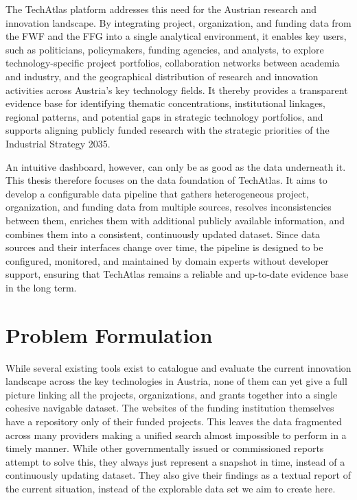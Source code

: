 The TechAtlas platform addresses this need for the Austrian research and innovation landscape.
By integrating project, organization, and funding data from the FWF and the FFG into a single analytical environment,
it enables key users, such as politicians, policymakers, funding agencies, and analysts, to explore technology-specific
project portfolios, collaboration networks between academia and industry, and the geographical distribution of research
and innovation activities across Austria's key technology fields.
It thereby provides a transparent evidence base for identifying thematic concentrations, institutional linkages,
regional patterns, and potential gaps in strategic technology portfolios, and supports aligning publicly funded research
with the strategic priorities of the Industrial Strategy 2035.

An intuitive dashboard, however, can only be as good as the data underneath it.
This thesis therefore focuses on the data foundation of TechAtlas.
It aims to develop a configurable data pipeline that gathers heterogeneous project, organization, and funding data from
multiple sources, resolves inconsistencies between them, enriches them with additional publicly available information,
and combines them into a consistent, continuously updated dataset.
Since data sources and their interfaces change over time, the pipeline is designed to be configured, monitored, and
maintained by domain experts without developer support, ensuring that TechAtlas remains a reliable and up-to-date
evidence base in the long term.

\section{Problem Formulation}


While several existing tools exist to catalogue and evaluate the current innovation landscape across the key technologies in Austria, none of them can yet give a full picture linking all the projects, organizations, and grants together into a single cohesive navigable dataset.
The websites of the funding institution themselves have a repository only of their funded projects. This leaves the data fragmented across many providers making a unified search almost impossible to perform in a timely manner.
While other governmentally issued or commissioned reports attempt to solve this, they always just represent a snapshot in time, instead of a continuously updating dataset.
They also give their findings as a textual report of the current situation, instead of the explorable data set we aim to create here.

